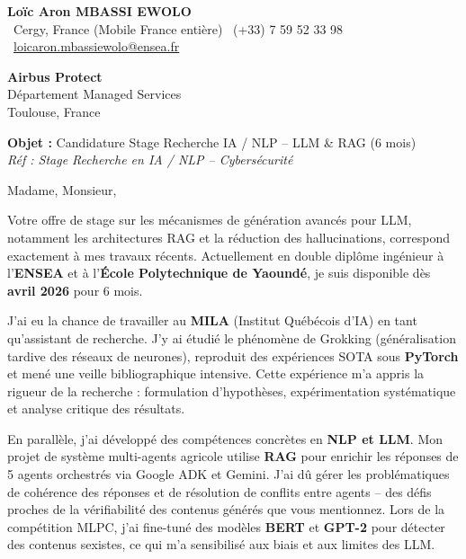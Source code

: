 \documentclass[a4paper,11pt]{article}
\begin{document}
\begin{center}
    {\Large \textbf{Loïc Aron MBASSI EWOLO}}\\[4pt]
    \small
    \faMapMarker\ Cergy, France (Mobile France entière) \quad
    \faPhone\ (+33) 7 59 52 33 98 \quad
    \faEnvelope\ \href{mailto:loicaron.mbassiewolo@ensea.fr}{loicaron.mbassiewolo@ensea.fr}
\end{center}
\vspace{0.5cm}

\hfill
\begin{minipage}[t]{0.45\textwidth}
    \textbf{Airbus Protect}\\
    Département Managed Services\\
    Toulouse, France
\end{minipage}

\vspace{0.8cm}

\textbf{Objet :} Candidature Stage Recherche IA / NLP -- LLM \& RAG (6 mois)\\
\textit{Réf : Stage Recherche en IA / NLP -- Cybersécurité}

\vspace{0.5cm}

Madame, Monsieur,

Votre offre de stage sur les mécanismes de génération avancés pour LLM, notamment les architectures RAG et la réduction des hallucinations, correspond exactement à mes travaux récents. Actuellement en double diplôme ingénieur à l'\textbf{ENSEA} et à l'\textbf{École Polytechnique de Yaoundé}, je suis disponible dès \textbf{avril 2026} pour 6 mois.

J'ai eu la chance de travailler au \textbf{MILA} (Institut Québécois d'IA) en tant qu'assistant de recherche. J'y ai étudié le phénomène de Grokking (généralisation tardive des réseaux de neurones), reproduit des expériences SOTA sous \textbf{PyTorch} et mené une veille bibliographique intensive. Cette expérience m'a appris la rigueur de la recherche : formulation d'hypothèses, expérimentation systématique et analyse critique des résultats.

En parallèle, j'ai développé des compétences concrètes en \textbf{NLP et LLM}. Mon projet de système multi-agents agricole utilise \textbf{RAG} pour enrichir les réponses de 5 agents orchestrés via Google ADK et Gemini. J'ai dû gérer les problématiques de cohérence des réponses et de résolution de conflits entre agents -- des défis proches de la vérifiabilité des contenus générés que vous mentionnez. Lors de la compétition MLPC, j'ai fine-tuné des modèles \textbf{BERT} et \textbf{GPT-2} pour détecter des contenus sexistes, ce qui m'a sensibilisé aux biais et aux limites des LLM.
\end{document}
